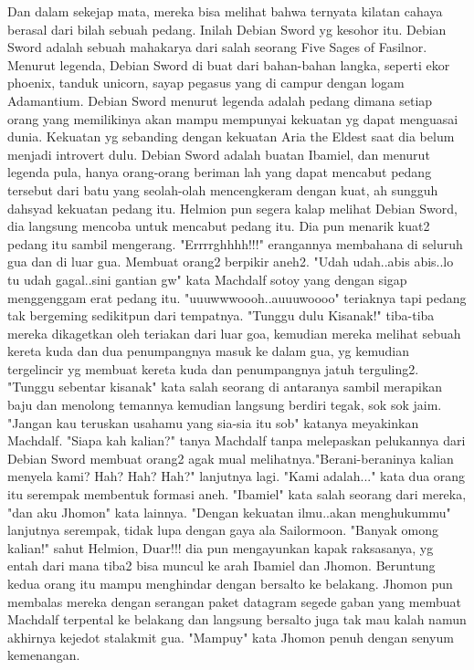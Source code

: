 \documentclass[a4paper,11pt,final]{article}
\begin{document}
Dan dalam sekejap mata, mereka bisa melihat bahwa ternyata kilatan cahaya berasal dari bilah sebuah pedang. Inilah Debian Sword yg kesohor itu.
Debian Sword adalah sebuah mahakarya dari salah seorang Five Sages of Fasilnor. Menurut legenda, Debian Sword di buat dari bahan-bahan langka, seperti ekor phoenix, tanduk unicorn, sayap pegasus yang di campur dengan logam Adamantium.
Debian Sword menurut legenda adalah pedang dimana setiap orang yang memilikinya akan mampu mempunyai kekuatan yg dapat menguasai dunia. Kekuatan yg sebanding dengan kekuatan Aria the Eldest saat dia belum menjadi introvert dulu.
Debian Sword adalah buatan Ibamiel, dan menurut legenda pula, hanya orang-orang beriman lah yang dapat mencabut pedang tersebut dari batu yang seolah-olah mencengkeram dengan kuat, ah sungguh dahsyad kekuatan pedang itu.
Helmion pun segera kalap melihat Debian Sword, dia langsung mencoba untuk mencabut pedang itu. Dia pun menarik kuat2 pedang itu sambil mengerang. "Errrrghhhh!!!" erangannya membahana di seluruh gua dan di luar gua. Membuat orang2 berpikir aneh2.
"Udah udah..abis abis..lo tu udah gagal..sini gantian gw" kata Machdalf sotoy yang dengan sigap menggenggam erat pedang itu. "uuuwwwoooh..auuuwoooo" teriaknya tapi pedang tak bergeming sedikitpun dari tempatnya.
"Tunggu dulu Kisanak!" tiba-tiba mereka dikagetkan oleh teriakan dari luar goa, kemudian mereka melihat sebuah kereta kuda dan dua penumpangnya masuk ke dalam gua, yg kemudian tergelincir yg membuat kereta kuda dan penumpangnya jatuh terguling2.
"Tunggu sebentar kisanak" kata salah seorang di antaranya sambil merapikan baju dan menolong temannya kemudian langsung berdiri tegak, sok sok jaim. "Jangan kau teruskan usahamu yang sia-sia itu sob" katanya meyakinkan Machdalf.
"Siapa kah kalian?" tanya Machdalf tanpa melepaskan pelukannya dari Debian Sword membuat orang2 agak mual melihatnya."Berani-beraninya kalian menyela kami? Hah? Hah? Hah?" lanjutnya lagi.
"Kami adalah..." kata dua orang itu serempak membentuk formasi aneh. "Ibamiel" kata salah seorang dari mereka, "dan aku Jhomon" kata lainnya. "Dengan kekuatan ilmu..akan menghukummu" lanjutnya serempak, tidak lupa dengan gaya ala Sailormoon.
"Banyak omong kalian!" sahut Helmion, Duar!!! dia pun mengayunkan kapak raksasanya, yg entah dari mana tiba2 bisa muncul ke arah Ibamiel dan Jhomon. Beruntung kedua orang itu mampu menghindar dengan bersalto ke belakang.
Jhomon pun membalas mereka dengan serangan paket datagram segede gaban yang membuat Machdalf terpental ke belakang dan langsung bersalto juga tak mau kalah namun akhirnya kejedot stalakmit gua. "Mampuy" kata Jhomon penuh dengan senyum kemenangan.
\end{document}
